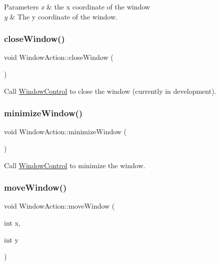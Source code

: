 \begin{DoxyParams}{Parameters}
{\em x} & the x coordinate of the window \\
\hline
{\em y} & The y coordinate of the window. \\
\hline
\end{DoxyParams}
\mbox{\label{classWindowAction_a99150ce49f2956c56e64b6ba0246424f}} 
\subsubsection{\texorpdfstring{close\+Window()}{closeWindow()}}
{\footnotesize\ttfamily void Window\+Action\+::close\+Window (\begin{DoxyParamCaption}{ }\end{DoxyParamCaption})}

Call \hyperlink{classWindowControl}{Window\+Control} to close the window (currently in development). \mbox{\label{classWindowAction_aa6f2b2543505c0c44027b501f151d4bf}} 
\subsubsection{\texorpdfstring{minimize\+Window()}{minimizeWindow()}}
{\footnotesize\ttfamily void Window\+Action\+::minimize\+Window (\begin{DoxyParamCaption}{ }\end{DoxyParamCaption})}

Call \hyperlink{classWindowControl}{Window\+Control} to minimize the window. \mbox{\label{classWindowAction_ae79c374bbbc84ff3dfb8565ede5f4220}} 
\subsubsection{\texorpdfstring{move\+Window()}{moveWindow()}}
{\footnotesize\ttfamily void Window\+Action\+::move\+Window (\begin{DoxyParamCaption}\item[{int}]{x,  }\item[{int}]{y }\end{DoxyParamCaption})}

